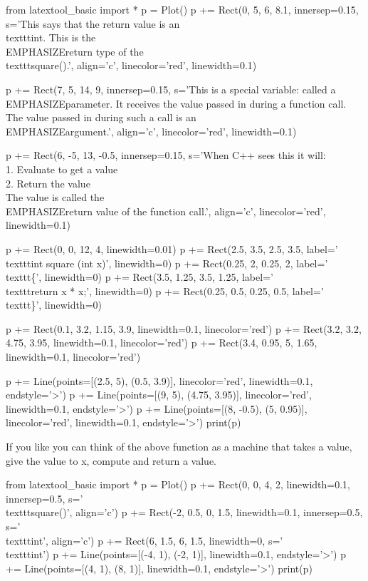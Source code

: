 \begin{python}
from latextool_basic import *
p = Plot()
p += Rect(0, 5, 6, 8.1, innersep=0.15, s='This says that the return value is an \\texttt{int}. This is the \\EMPHASIZE{return type} of the \\texttt{square()}.', align='c', linecolor='red', linewidth=0.1)

p += Rect(7, 5, 14, 9, innersep=0.15, s='This is a special variable: called a \\EMPHASIZE{parameter}. It receives the value passed in during a function call. The value passed in during such a call is an \\EMPHASIZE{argument}.', align='c', linecolor='red', linewidth=0.1)

p += Rect(6, -5, 13, -0.5, innersep=0.15, s='When C++ sees this it will:\\ 1. Evaluate to get a value\\ 2. Return the value \\ The value is called the \\EMPHASIZE{return value} of the function call.', align='c', linecolor='red', linewidth=0.1)

p += Rect(0, 0, 12, 4, linewidth=0.01)
p += Rect(2.5, 3.5, 2.5, 3.5, label='\\texttt{int square (int x)}', linewidth=0)
p += Rect(0.25, 2, 0.25, 2, label='\\texttt{\{}', linewidth=0)
p += Rect(3.5, 1.25, 3.5, 1.25, label='\\texttt{return x * x;}', linewidth=0)
p += Rect(0.25, 0.5, 0.25, 0.5, label='\\texttt{\}}', linewidth=0)

p += Rect(0.1, 3.2, 1.15, 3.9, linewidth=0.1, linecolor='red')
p += Rect(3.2, 3.2, 4.75, 3.95, linewidth=0.1, linecolor='red')
p += Rect(3.4, 0.95, 5, 1.65, linewidth=0.1, linecolor='red')

p += Line(points=[(2.5, 5), (0.5, 3.9)], linecolor='red', linewidth=0.1, endstyle='>')
p += Line(points=[(9, 5), (4.75, 3.95)], linecolor='red', linewidth=0.1, endstyle='>')
p += Line(points=[(8, -0.5), (5, 0.95)], linecolor='red', linewidth=0.1, endstyle='>')
print(p)
\end{python}

If you like you can think of the above function as a machine that takes a value, give the value to x, compute and return a value.

\begin{python}
from latextool_basic import *
p = Plot()
p += Rect(0, 0, 4, 2, linewidth=0.1, innersep=0.5, s='\\texttt{square()}', align='c')
p += Rect(-2, 0.5, 0, 1.5, linewidth=0.1, innersep=0.5, s='\\texttt{int}', align='c')
p += Rect(6, 1.5, 6, 1.5, linewidth=0, s='\\texttt{int}')
p += Line(points=[(-4, 1), (-2, 1)], linewidth=0.1, endstyle='>')
p += Line(points=[(4, 1), (8, 1)], linewidth=0.1, endstyle='>')
print(p)
\end{python}


